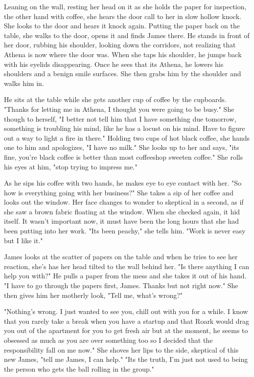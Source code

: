         Leaning on the wall, resting her head on it as she holds the paper for inspection, the other hand with coffee, she hears the door call
    to her in slow hollow knock. She looks to the door and hears it knock again. Putting the paper back on the table, she walks to the door,
    opens it and finds James there. He stands in front of her door, rubbing his shoulder, looking down the corridors, not realizing that Athena
    is now where the door was. When she taps his shoulder, he jumps back with his eyelids disappearing. Once he sees that its Athena, he lowers
    his shoulders and a benign smile surfaces. She then grabs him by the shoulder and walks him in.

        He sits at the table while she gets another cup of coffee by the cupboards. "Thanks for letting me in Athena, I thought you were going
    to be busy." She though to herself, "I better not tell him that I have something due tomorrow, something is troubling his mind, like he
    has a locust on his mind. Have to figure out a way to light a fire in there." Holding two cups of hot black coffee, she hands one to him
    and apologizes, "I have no milk." She looks up to her and says, "its fine, you're black coffee is better than most coffeeshop sweeten coffee."
    She rolls his eyes at him, "stop trying to impress me."

        As he sips his coffee with two hands, he makes eye to eye contact with her. "So how is everything going with her business?" She takes
    a sip of her coffee and looks out the window. Her face changes to wonder to skeptical in a second, as if she saw a brown fabric floating
    at the window. When she checked again, it hid itself. It wasn't important now, it must have been the long hours that she had been putting
    into her work. "Its been peachy," she tells him. "Work is never easy but I like it."

        James looks at the scatter of papers on the table and when he tries to see her reaction, she's has her head tilted to the wall behind
    her. "Is there anything I can help you with?" He pulls a paper from the mess and she takes it out of his hand. "I have to go through the
    papers first, James. Thanks but not right now." She then gives him her motherly look, "Tell me, what's wrong?"

        "Nothing's wrong. I just wanted to see you, chill out with you for a while. I know that you rarely take a break when you have a startup
    and that Roark would drag you out of the apartment for you to get fresh air but at the moment, he seems to obsessed as much as you are over
    something too so I decided that the responsibility fall on me now." She shoves her lips to the side, skeptical of this new James, "tell me
    James, I can help." "Its the truth, I'm just not used to being the person who gets the ball rolling in the group."

